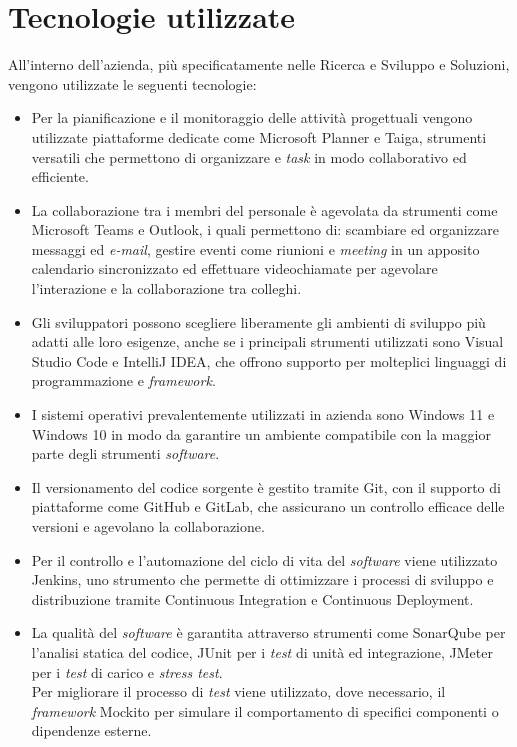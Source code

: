 \section{Tecnologie utilizzate}
All'interno dell'azienda, più specificatamente nelle  Ricerca e Sviluppo e Soluzioni, vengono utilizzate le seguenti tecnologie: 
\begin{itemize}
    \item Per la pianificazione e il monitoraggio delle attività progettuali vengono utilizzate piattaforme dedicate come Microsoft Planner e Taiga, strumenti versatili che permettono di organizzare  e \emph{task} in modo collaborativo ed efficiente. 
    \item La collaborazione tra i membri del personale è agevolata da strumenti come Microsoft Teams e Outlook, i quali permettono di: scambiare ed organizzare messaggi ed \emph{e-mail}, gestire eventi come riunioni e \emph{meeting} in un apposito calendario sincronizzato ed effettuare videochiamate per agevolare l'interazione e la collaborazione tra colleghi. 
    \item Gli sviluppatori possono scegliere liberamente gli ambienti di sviluppo più adatti alle loro esigenze, anche se i principali strumenti utilizzati sono Visual Studio Code e IntelliJ IDEA, che offrono supporto per molteplici linguaggi di programmazione e \emph{framework}. 
    \item I sistemi operativi prevalentemente utilizzati in azienda sono Windows 11 e Windows 10 in modo da garantire un ambiente compatibile con la maggior parte degli strumenti \emph{software}. 
    \item Il versionamento del codice sorgente è gestito tramite Git, con il supporto di piattaforme come GitHub e GitLab, che assicurano un controllo efficace delle versioni e agevolano la collaborazione. 
    \item Per il controllo e l'automazione del ciclo di vita del \emph{software} viene utilizzato Jenkins, uno strumento che permette di ottimizzare i processi di sviluppo e distribuzione tramite \gls{Continuous Integration} e \gls{Continuous Deployment}. 
    \item La qualità del \emph{software} è garantita attraverso strumenti come SonarQube per l'analisi statica del codice, JUnit per i \emph{test} di unità ed integrazione, JMeter per i \emph{test} di carico e \emph{stress test}.\\
    Per migliorare il processo di \emph{test} viene utilizzato, dove necessario, il \emph{framework} Mockito per simulare il comportamento di specifici componenti o dipendenze esterne.\\

\end{itemize}
